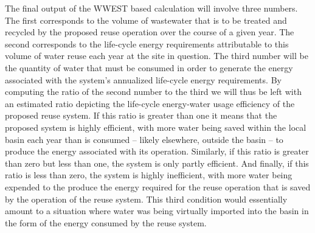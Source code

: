 The final output of the WWEST based calculation will involve three numbers. The first corresponds to the volume of wastewater that is to be treated and recycled by the proposed reuse operation over the course of a given year. The second corresponds to the life-cycle energy requirements attributable to this volume of water reuse each year at the site in question. The third number will be the quantity of water that must be consumed in order to generate the energy associated with the system's annualized life-cycle energy requirements. By computing the ratio of the second number to the third we will thus be left with an estimated ratio depicting the life-cycle energy-water usage efficiency of the proposed reuse system. If this ratio is greater than one it means that the proposed system is highly efficient, with more water being saved within the local basin each year than is consumed -- likely elsewhere, outside the basin -- to produce the energy associated with its operation. Similarly, if this ratio is greater than zero but less than one, the system is only partly efficient. And finally, if this ratio is less than zero, the system is highly inefficient, with more water being expended to the produce the energy required for the reuse operation that is saved by the operation of the reuse system. This third condition would essentially amount to a situation where water was being virtually imported into the basin in the form of the energy consumed by the reuse system.

\clearpage